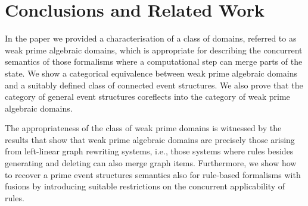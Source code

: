 \documentclass[conference]{IEEEtran}
\newcommand{\Rrel}[1]   {\stackrel{{#1}}{\Longrightarrow}}
\begin{document}





 
\section{Conclusions and Related Work}
\label{se:conc}

In the paper we provided a characterisation of a class of domains,
referred to as weak prime algebraic domains, which is appropriate for
describing the concurrent semantics of those formalisms where a
computational step can merge parts of the state. We show a
categorical equivalence between weak prime algebraic domains and a
suitably defined class of connected event structures. We also prove
that the category of general event structures coreflects into
the category of weak prime algebraic domains.

The appropriateness of
the class of weak prime domains is witnessed by the results 
that show that weak prime algebraic domains
are precisely those arising from left-linear graph rewriting systems,
i.e., those systems where rules besides generating and deleting can
also merge graph items.
%
Furthermore, we show how to recover 
a prime event structures semantics also for rule-based
formalisms with fusions by introducing suitable restrictions on the
concurrent applicability of rules.
\end{document}
